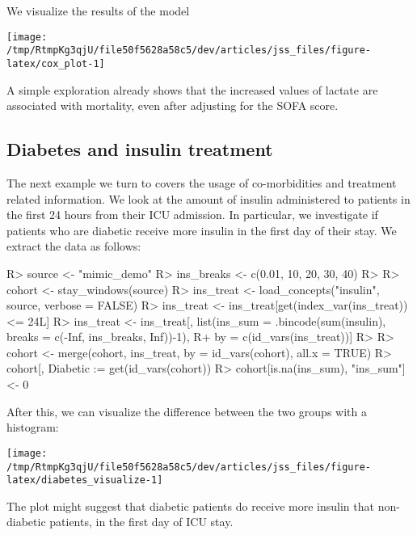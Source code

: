 \documentclass[
]{jss}
\begin{document}
We visualize the results of the model

\begin{CodeChunk}


\begin{center}\texttt{[image: /tmp/RtmpKg3qjU/file50f5628a58c5/dev/articles/jss\_files/figure-latex/cox\_plot-1]} \end{center}

\end{CodeChunk}

A simple exploration already shows that the increased values of lactate
are associated with mortality, even after adjusting for the SOFA score.

\hypertarget{diabetes-and-insulin-treatment}{%
\subsection{Diabetes and insulin
treatment}\label{diabetes-and-insulin-treatment}}

The next example we turn to covers the usage of co-morbidities and
treatment related information. We look at the amount of insulin
administered to patients in the first 24 hours from their ICU admission.
In particular, we investigate if patients who are diabetic receive more
insulin in the first day of their stay. We extract the data as follows:

\begin{CodeChunk}

\begin{CodeInput}
R> source <- "mimic_demo"
R> ins_breaks <- c(0.01, 10, 20, 30, 40)
R> 
R> cohort <- stay_windows(source)
R> ins_treat <- load_concepts("insulin", source, verbose = FALSE)
R> ins_treat <- ins_treat[get(index_var(ins_treat)) <= 24L]
R> ins_treat <- ins_treat[, list(ins_sum = .bincode(sum(insulin), breaks = c(-Inf, ins_breaks, Inf))-1),
R+   by = c(id_vars(ins_treat))]
R> 
R> cohort <- merge(cohort, ins_treat, by = id_vars(cohort), all.x = TRUE)
R> cohort[, Diabetic := get(id_vars(cohort)) %
R> cohort[is.na(ins_sum), "ins_sum"] <- 0
\end{CodeInput}
\end{CodeChunk}

After this, we can visualize the difference between the two groups with
a histogram:

\begin{CodeChunk}


\begin{center}\texttt{[image: /tmp/RtmpKg3qjU/file50f5628a58c5/dev/articles/jss\_files/figure-latex/diabetes\_visualize-1]} \end{center}

\end{CodeChunk}

The plot might suggest that diabetic patients do receive more insulin
that non-diabetic patients, in the first day of ICU stay.


\end{document}
